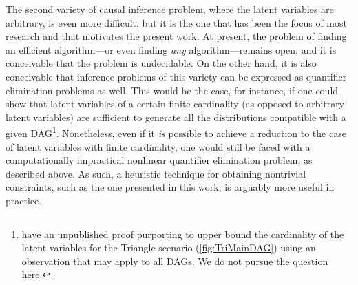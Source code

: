 \documentclass[aps,english,10pt,superscriptaddress,onecolumn,twoside,longbibliography,pra,floatfix,fleqn,nofootinbib]{revtex4-1}%
\theoremstyle{definition}
\begin{document}
The second variety of causal inference problem, where the latent variables are arbitrary, is even more difficult, but it is the one that has been the focus of most research and that motivates the present work. At present, the problem of finding an efficient algorithm---or even finding \emph{any} algorithm---remains open, and it is conceivable that the problem is undecidable. On the other hand, it is also conceivable that inference problems of this variety can be expressed as quantifier elimination problems as well. This would be the case, for instance, if one could show that latent variables of a certain finite cardinality (as opposed to arbitrary latent variables) are sufficient to generate all the distributions compatible with a given DAG\footnote{\citet{rosset2016finite} have an unpublished proof purporting to upper bound the cardinality of the latent variables for the Triangle scenario (\cref{fig:TriMainDAG}) using an observation that may apply to all DAGs. We do not pursue the question here.}. Nonetheless, even if it {\em is} possible to achieve a reduction to the case of latent variables with finite cardinality, one would still be faced with a computationally impractical nonlinear quantifier elimination problem, as described above. As such, a heuristic technique for obtaining nontrivial constraints, such as the one presented in this work, is arguably more useful in practice.
\end{document}
